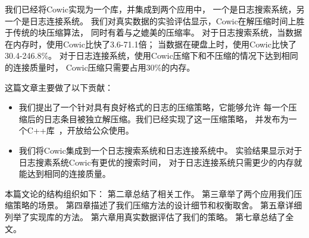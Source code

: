 我们已经将Cowic实现为一个库，并集成到两个应用中，
一个是日志搜索系统，另一个是日志连接系统。
我们对真实数据的实验评估显示，Cowic在解压缩时间上胜于传统的块压缩算法，
同时有着与之媲美的压缩率。
对于日志搜索系统，当数据在内存时，使用Cowic比快了3.6-71.1倍；
当数据在硬盘上时，使用Cowic比快了30.4-246.8\%。
对于日志连接系统，使用Cowic压缩下和不压缩的情况下达到相同的连接质量时，
Cowic压缩只需要占用30\%的内存。

这篇文章主要做了以下贡献：

\begin{itemize}
	\item 我们提出了一个针对具有良好格式的日志的压缩策略，它能够允许
	每一个压缩后的日志条目被独立解压缩。我们已经实现了这一压缩策略，
	并发布为一个C++库~\cite{cowic}，开放给公众使用。

	\item 我们将Cowic集成到一个日志搜索系统和日志连接系统中。
	实验结果显示对于日志搜素系统Cowic有更优的搜索时间，
	对于日志连接系统只需更少的内存就能达到相同的连接质量。
\end{itemize}

本篇文论的结构组织如下：
第二章总结了相关工作。
第三章举了两个应用我们压缩策略的场景。
第四章描述了我们压缩方法的设计细节和权衡取舍。
第五章详细列举了实现库的方法。
第六章用真实数据评估了我们的策略。
第七章总结了全文。
